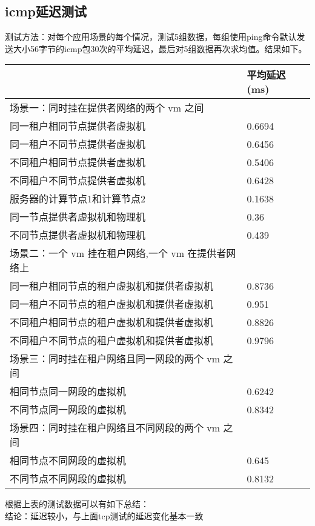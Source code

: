 \documentclass[a4paper,left=1.5cm,right=1.5cm,11pt]{article}
\begin{document}
\subsection{icmp延迟测试}
测试方法：对每个应用场景的每个情况，测试5组数据，每组使用ping命令默认发送大小56字节的icmp包30次的平均延迟，最后对5组数据再次求均值。结果如下。
\begin{center}
\begin{tabular}[c]{|l|l|}
\hline
 &  平均延迟(ms) \\
\hline
 场景一：同时挂在提供者网络的两个 vm 之间 &  \\
\hline
 同一租户相同节点提供者虚拟机 & 0.6694 \\
\hline
 同一租户不同节点提供者虚拟机 & 0.6456 \\
 \hline
 不同租户相同节点提供者虚拟机& 0.5406 \\
 \hline
 不同租户不同节点提供者虚拟机& 0.6428 \\
 \hline
 服务器的计算节点1和计算节点2& 0.1638 \\
 \hline
 同一节点提供者虚拟机和物理机& 0.36 \\
 \hline
 不同节点提供者虚拟机和物理机& 0.439 \\
 \hline
 \hline
 场景二：一个 vm 挂在租户网络,一个 vm 在提供者网络上& \\
 \hline
 同一租户相同节点的租户虚拟机和提供者虚拟机& 0.8736 \\
 \hline
 同一租户不同节点的租户虚拟机和提供者虚拟机& 0.951 \\
 \hline
 不同租户相同节点的租户虚拟机和提供者虚拟机& 0.8826 \\
 \hline
 不同租户不同节点的租户虚拟机和提供者虚拟机& 0.9796 \\
 \hline
 \hline
 场景三：同时挂在租户网络且同一网段的两个 vm 之间& \\
 \hline
 相同节点同一网段的虚拟机& 0.6242 \\
 \hline
 不同节点同一网段的虚拟机&  0.8342\\
 \hline
 \hline
 场景四：同时挂在租户网络且不同网段的两个 vm 之间& \\
 \hline
 相同节点不同网段的虚拟机&  0.645\\
 \hline
 不同节点不同网段的虚拟机&  0.8132\\

\hline
\end{tabular}
\end{center}

根据上表的测试数据可以有如下总结：\\
结论：延迟较小，与上面tcp测试的延迟变化基本一致
\end{document}
